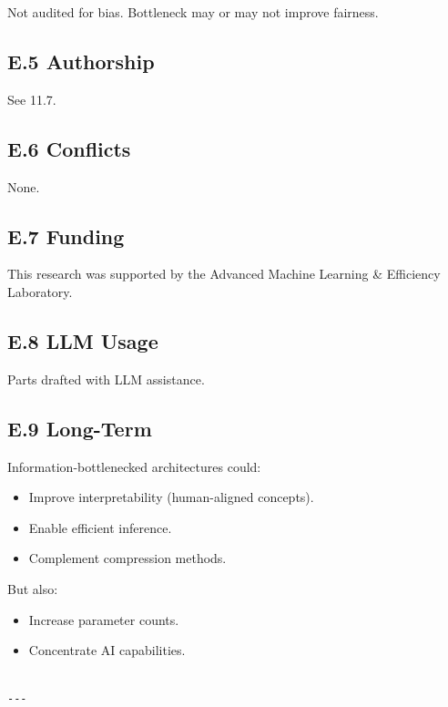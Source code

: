 Not audited for bias. Bottleneck may or may not improve fairness.

\subsection{E.5 Authorship}

See  11.7.

\subsection{E.6 Conflicts}

None.

\subsection{E.7 Funding}

This research was supported by the Advanced Machine Learning \& Efficiency Laboratory.

\subsection{E.8 LLM Usage}

Parts drafted with LLM assistance.

\subsection{E.9 Long-Term}

Information-bottlenecked architectures could:
\begin{itemize}
\item Improve interpretability (human-aligned concepts).
\item Enable efficient inference.
\item Complement compression methods.

\end{itemize}
But also:
\begin{itemize}
\item Increase parameter counts.
\item Concentrate AI capabilities.
\end{itemize}
\begin{lstlisting}

---
\end{lstlisting}